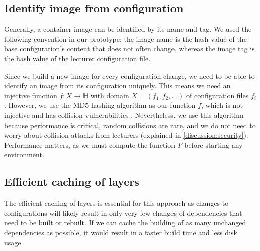 \subsection{Identify image from configuration}\label{identify-images-with-configuration}
Generally, a container image can be identified by its name and tag. We used the following convention in our prototype: the image name is the hash value of the base configuration's content that does not often change, whereas the image tag is the hash value of the lecturer configuration file. 

Since we build a new image for every configuration change, we need to be able to identify an image from its configuration uniquely. This means we need an injective function \(f\colon X\to \mathbb{H}\) with domain $X={(f_1, f_2,\dots)}$ of configuration files $f_i$. However, we use the \textsc{MD5} hashing algorithm as our function $f$, which is not injective and has collision vulnerabilities \cite{Stevens2012}. Nevertheless, we use this algorithm because performance is critical, random collisions are rare, and we do not need to worry about collision attacks from lecturers (explained in \ref{discussion:security}). Performance matters, as we must compute the function $F$ before starting any environment.

\subsection{Efficient caching of layers}\label{efficient-caching-of-layers}
The efficient caching of layers is essential for this approach as changes to configurations will likely result in only very few changes of dependencies that need to be built or rebuilt. If we can cache the building of as many unchanged dependencies as possible, it would result in a faster build time and less disk usage.

